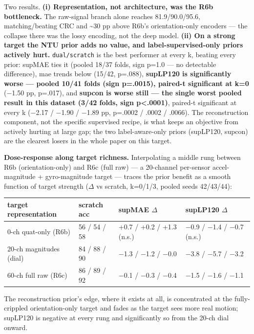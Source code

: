 Two results. \textbf{(i) Representation, not architecture, was the R6b bottleneck.} The raw-signal branch alone reaches 81.9/90.0/95.6, matching/beating CRC and \textasciitilde{}30 pp above R6b's orientation-only encoders --- the collapse there was the lossy encoding, not the deep model. \textbf{(ii) On a strong target the NTU prior adds no value, and label-supervised-only priors actively hurt.} \texttt{dual/scratch} is the best performer at every k, beating every prior: supMAE ties it (pooled 18/37 folds, sign p=1.0 --- no detectable difference), mae trends below (15/42, p=.088), \textbf{supLP120 is significantly worse --- pooled 10/41 folds (sign p=.0015), paired-t significant at k=0} ($-$1.50 pp, p=.017), and \textbf{supcon is worse still --- the single worst pooled result in this dataset (3/42 folds, sign p<.0001)}, paired-t significant at every k ($-$2.17 / $-$1.90 / $-$1.89 pp, p=.0002 / .0002 / .0066). The reconstruction component, not the specific supervised recipe, is what keeps an objective from actively hurting at large gap; the two label-aware-only priors (supLP120, supcon) are the clearest losers in the whole paper on this target.

\textbf{Dose-response along target richness.} Interpolating a middle rung between R6b (orientation-only) and R6c (full raw) --- a 20-channel per-sensor accel-magnitude + gyro-magnitude target --- traces the prior benefit as a smooth function of target strength ($\Delta$ vs scratch, k=0/1/3, pooled seeds 42/43/44):

\begin{center}
\small
\begin{tabular}{llll}
\toprule
target representation & scratch acc & supMAE $\Delta$ & supLP120 $\Delta$ \\
\midrule
0-ch quat-only (R6b) & 56 / 54 / 58 & +0.7 / +0.2 / +1.3 (n.s.) & $-$0.9 / $-$1.4 / $-$0.7 (n.s.) \\
20-ch magnitudes (dial) & 84 / 88 / 90 & $-$1.3 / $-$1.2 / $-$0.0 & $-$3.8 / $-$5.7 / $-$3.2 \\
60-ch full raw (R6c) & 86 / 89 / 92 & $-$0.1 / $-$0.3 / $-$0.4 & $-$1.5 / $-$1.6 / $-$1.1 \\
\bottomrule
\end{tabular}
\end{center}

The reconstruction prior's edge, where it exists at all, is concentrated at the fully-crippled orientation-only target and fades as the target sees more real motion; supLP120 is negative at every rung and significantly so from the 20-ch dial onward.

